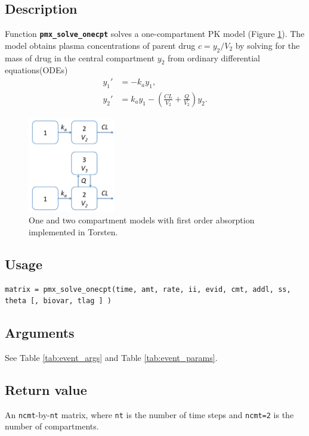 \documentclass[10pt, reqno, oneside]{amsbook}
\numberwithin{equation}{chapter}
\numberwithin{figure}{chapter}
\numberwithin{table}{chapter}
\theoremstyle{remark}
\begin{document}
\subsection{Description}
\label{sec:org557a461}
Function {\small \color{MRGGreen} \texttt{\textbf{pmx\_solve\_onecpt}}} solves a one-compartment PK
model (Figure \ref{one_two_cpt_models}). The model obtains plasma concentrations of parent drug \(c=y_2/V_2\)
by solving for the mass of drug in the central compartment
\(y_2\) from ordinary differential equations(ODEs)
\begin{subequations}
\begin{align}
  y_1' &= -k_a y_1, \\
  y_2' &= k_a y_1 - \left(\frac{CL}{V_2} + \frac{Q}{V_2}\right) y_2.
\end{align}
\label{eq:onecpt}
\end{subequations}
\begin{figure}[htbp]
\centering
\includegraphics[width=1.5in]{./graphics/cptModels.png}
\caption{\label{one_two_cpt_models}
One and two compartment models with first order absorption implemented in Torsten.}
\end{figure}

\subsection{Usage}
\label{sec:org8ee9206}
\begin{verbatim}
matrix = pmx_solve_onecpt(time, amt, rate, ii, evid, cmt, addl, ss, theta [, biovar, tlag ] )
\end{verbatim}

\subsection{Arguments}
\label{sec:org919f75c}
See Table \ref{tab:event_args} and Table \ref{tab:event_params}.
\subsection{Return value}
\label{sec:orgaea91c7}
An \texttt{ncmt}-by-\texttt{nt} matrix, where \texttt{nt} is the number of time steps and \texttt{ncmt=2} is the number of compartments.    
\end{document}
